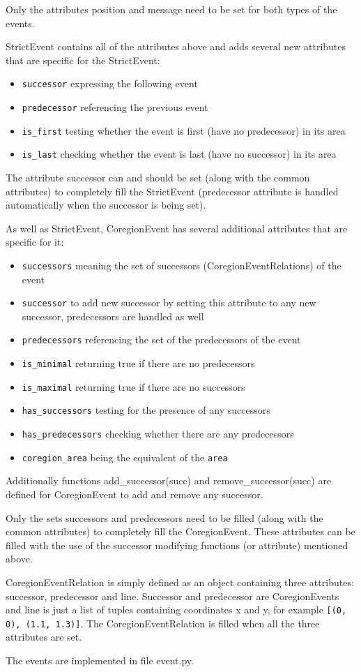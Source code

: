 \documentclass[11pt,oneside]{fithesis2}
\newcommand{\T}[1]{\texttt{#1}}
\newcommand{\ite}[1]{\item{\texttt{#1}}}
\begin{document}
Only the attributes position and message need to be set for both types of the events.

StrictEvent contains all of the attributes above and adds several new attributes that are specific for the StrictEvent:
\begin{itemize}
\ite{successor} expressing the following event
\ite{predecessor} referencing the previous event
\ite{is\_first} testing whether the event is first (have no predecessor) in its area
\ite{is\_last} checking whether the event is last (have no successor) in its area
\end{itemize}

The attribute successor can and should be set (along with the common attributes) to completely fill the StrictEvent (predecessor attribute is handled automatically when the successor is being set).

As well as StrictEvent, CoregionEvent has several additional attributes that are specific for it:
\begin{itemize}
\ite{successors} meaning the set of successors (CoregionEventRelations) of the event
\ite{successor} to add new successor by setting this attribute to any new successor, predecessors are handled as well 
\ite{predecessors} referencing  the set of the predecessors of the event
\ite{is\_minimal} returning true if there are no predecessors
\ite{is\_maximal} returning true if there are no successors
\ite{has\_successors} testing for the presence of any successors
\ite{has\_predecessors} checking whether there are any predecessors
\ite{coregion\_area} being the equivalent of the \T{area}
\end{itemize}

Additionally functions add\_successor(succ) and remove\_successor(succ) are defined for CoregionEvent to add and remove any successor.

Only the sets successors and predecessors need to be filled (along with the common attributes) to completely fill the CoregionEvent. These attributes can be filled with the use of the successor modifying functions (or attribute) mentioned above.

CoregionEventRelation is simply defined as an object containing three attributes: successor, predecessor and line. Successor and predecessor are CoregionEvents and line is just a list of tuples containing coordinates x and y, for example \T{[(0, 0), (1.1, 1.3)]}. The CoregionEventRelation is filled when all the three attributes are set.

The events are implemented in file event.py.
\end{document}
